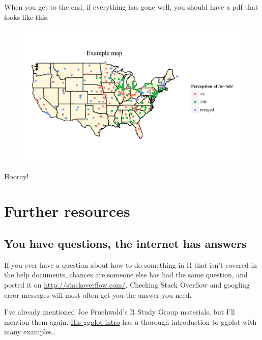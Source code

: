 \documentclass[12pt]{article}
\begin{document}
When you get to the end, if everything has gone well, you should have a pdf that looks like this:
\begin{figure}[h]
\includegraphics[width=\linewidth]{telsur-example.pdf}
\end{figure}

Hooray!

\clearpage
\section{Further resources}
\subsection{You have questions, the internet has answers}
If you ever have a question about how to do something in R that isn't covered in the help documents, chances are someone else has had the same question, and posted it on \url{http://stackoverflow.com/}. Checking Stack Overflow and googling error messages will most often get you the answer you need.

I've already mentioned Joe Fruehwald's R Study Group materials, but I'll mention them again. \href{http://jofrhwld.github.io/rstudy/summer2010_ggplot2_intro.html}{His ggplot intro} has a thorough introduction to ggplot with many examples..
\end{document}

